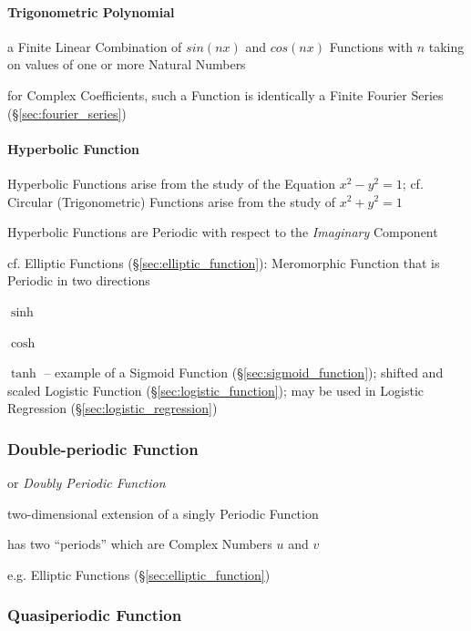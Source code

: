 \paragraph{Trigonometric Polynomial}\label{sec:trigonometric_polynomial}\hfill

a Finite Linear Combination of $sin(nx)$ and $cos(nx)$ Functions with $n$ taking
on values of one or more Natural Numbers

for Complex Coefficients, such a Function is identically a Finite Fourier Series
(\S\ref{sec:fourier_series})



\paragraph{Hyperbolic Function}\label{sec:hyperbolic_function}\hfill

Hyperbolic Functions arise from the study of the Equation $x^2 - y^2 = 1$; cf.
Circular (Trigonometric) Functions arise from the study of $x^2 + y^2 = 1$

Hyperbolic Functions are Periodic with respect to the \emph{Imaginary}
Component

cf. Elliptic Functions (\S\ref{sec:elliptic_function}): Meromorphic Function
that is Periodic in two directions

$\sinh$

$\cosh$

$\tanh$ -- example of a Sigmoid Function (\S\ref{sec:sigmoid_function}); shifted
and scaled Logistic Function (\S\ref{sec:logistic_function}); may be used in
Logistic Regression (\S\ref{sec:logistic_regression})



\subsubsection{Double-periodic Function}\label{sec:double_periodic}

or \emph{Doubly Periodic Function}

two-dimensional extension of a singly Periodic Function

has two ``periods'' which are Complex Numbers $u$ and $v$

e.g. Elliptic Functions (\S\ref{sec:elliptic_function})



\subsubsection{Quasiperiodic Function}\label{sec:quasiperiodic_function}

